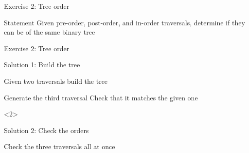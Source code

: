 \documentclass[handout]{beamer}
\begin{document}
\begin{frame}{Exercise 2: Tree order}
  \begin{overlayarea}{\textwidth}{\textheight}
  \begin{block}{Statement}
    Given pre-order, post-order, and in-order traversals, determine if they can be of the same binary tree
  \end{block}
  
  \end{overlayarea}
\end{frame}

\begin{frame}[fragile]{Exercise 2: Tree order}
  
  \begin{code}{Solution 1: Build the tree}
    \begin{PseudoCode}
Given two traversals build the tree

Generate the third traversal 
Check that it matches the given one
    \end{PseudoCode}
  \end{code}
  
  \begin{uncoverenv}<2>
  \begin{code}{Solution 2: Check the orders}
    \begin{PseudoCode}
Check the three traversals all at once 
    \end{PseudoCode}
  \end{code}
  \end{uncoverenv}
\end{frame}
\end{document}
